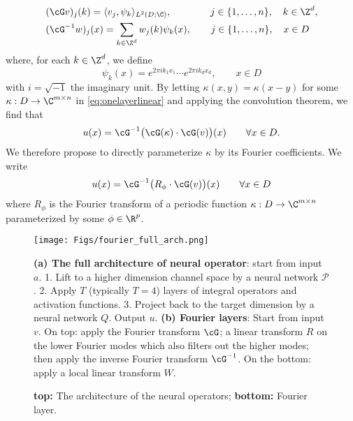\begin{align*}
    &(\cG v)_j (k) = \langle v_j, \psi_k \rangle_{L^2(D;\C)}, \qquad \qquad j \in \{1,\dots,n\}, \quad k \in \Z^d, \\
    &(\cG^{-1} w)_j (x) = \sum_{k \in \Z^d} w_j (k) \psi_k (x), \qquad j \in \{1,\dots,n\}, \quad x \in D
\end{align*}
where, for each \(k \in \Z^d\), we define
\[\psi_k (x) = e^{2\pi i k_1 x_1} \cdots e^{2 \pi i k_d x_d}, \qquad x \in D\]
with \(i = \sqrt{-1}\) the imaginary unit. By letting $\kappa(x,y) = \kappa(x-y)$ for some \(\kappa : D \to \C^{m \times n}\) in \eqref{eq:onelayerlinear} and applying the convolution theorem, we find that
\[u(x) = \cG^{-1} \bigl( \cG(\kappa) \cdot \cG(v) \bigr )(x) \qquad \forall x \in D.\]
We therefore propose to directly parameterize $\kappa$ by its Fourier coefficients. We write
\begin{equation}
    \label{eq:fourierlayer}
    u(x) = \cG^{-1} \bigl( R_\phi \cdot \cG(v) \bigr )(x) \qquad \forall x \in D
\end{equation}
where $R_\phi$ is the Fourier transform of a periodic function $\kappa: D \to \C^{m \times n}$ parameterized by some \(\phi \in \R^p\).

\iffalse
\begin{definition}[Fourier integral operator $\cK$] Define the Fourier integral operator
\begin{equation}
\label{eq:Fourier}
\bigl(\cK(\phi)v_t\bigr)(x)=   
\cG^{-1}\Bigl(R_\phi \cdot (\cG v_t) \Bigr)(x) \qquad \forall x \in D 
\end{equation}
where $R_\phi$ is the Fourier transform of a periodic function $\kappa: \bar{D} \to \R^{d_v \times d_v}$ parameterized by \(\phi \in \Theta_\cK\).
An illustration is given in Figure \ref{fig:arch} (b).
\end{definition}
\fi 

\begin{figure}
    \centering
    \texttt{[image: Figs/fourier\_full\_arch.png]}
        \caption{ {\bf top:} The architecture of the neural operators; \textbf{bottom:} Fourier layer.}
    \label{fig:arch}
    \small{
    {\bf (a) The full architecture of neural operator}: start from input $a$. 1. Lift to a higher dimension channel space by a neural network $\mathcal{P}$. 2. Apply $T$ (typically $T=4$) layers of integral operators and activation functions. 3. Project back to the target dimension by a neural network $Q$. Output $u$.
    {\bf (b) Fourier layers}: Start from input $v$. On top: apply the Fourier transform $\cG$; a linear transform $R$ on the lower Fourier modes which also filters out the higher modes; then apply the inverse Fourier transform $\cG^{-1}$. On the bottom: apply a local linear transform $W$.
    }
\end{figure}

